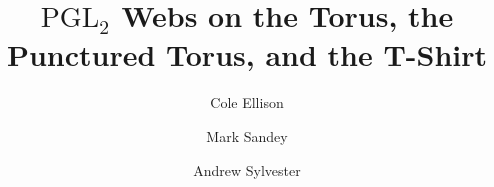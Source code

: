 \title{$\mathrm{PGL}_2$ Webs on the Torus, the Punctured Torus, and the T-Shirt}
\author[1]{Cole Ellison}
\author[2]{Mark Sandey}
\author[1]{Andrew Sylvester}
\date{}
